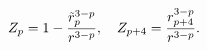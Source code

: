 \begin{equation}
Z_{p}=1-{\tilde{r}_{p}^{3-p}\over r^{3-p}},\quad
Z_{p+4}={r_{p+4}^{3-p}\over r^{3-p}}.
\label{eq:decoupling}
\end{equation}

